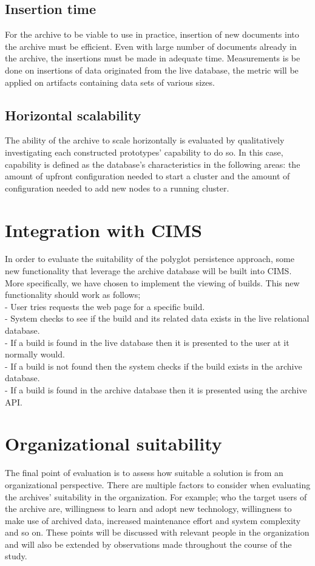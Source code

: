 \subsection{Insertion time}
For the archive to be viable to use in practice, insertion of new documents into the archive must be efficient. Even with large number of documents already in the archive, the insertions must be made in adequate time. Measurements is be done on insertions of data originated from the live database, the metric will be applied on artifacts containing data sets of various sizes.

\subsection{Horizontal scalability}
The ability of the archive to scale horizontally is evaluated by qualitatively investigating each constructed prototypes' capability to do so. In this case, capability is defined as the database's characteristics in the following areas: the amount of upfront configuration needed to start a cluster and the amount of configuration needed to add new nodes to a running cluster.

\section{Integration with CIMS}
In order to evaluate the suitability of the polyglot persistence approach, some new functionality that leverage the archive database will be built into CIMS. More specifically, we have chosen to implement the viewing of builds. This new functionality should work as follows; \\
- User tries requests the web page for a specific build. \\
- System checks to see if the build and its related data exists in the live relational database. \\
- If a build is found in the live database then it is presented to the user at it normally would. \\
- If a build is not found then the system checks if the build exists in the archive database. \\
- If a build is found in the archive database then it is presented using the archive API. \\

\section{Organizational suitability}
The final point of evaluation is to assess how suitable a solution is from an organizational perspective. There are multiple factors to consider when evaluating the archives' suitability in the organization. For example; who the target users of the archive are, willingness to learn and adopt new technology, willingness to make use of archived data, increased maintenance effort and system complexity and so on. These points will be discussed with relevant people in the organization and will also be extended by observations made throughout the course of the study.

